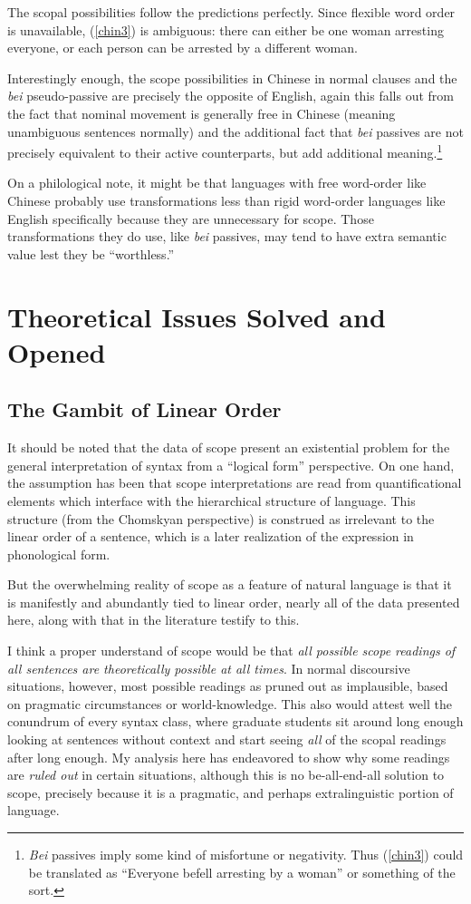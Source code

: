 \documentclass{article}
\begin{document}
The scopal possibilities follow the predictions perfectly. Since flexible word order is unavailable, (\ref{chin3}) is ambiguous: there can either be one woman arresting everyone, or each person can be arrested by a different woman.

Interestingly enough, the scope possibilities in Chinese in normal clauses and the \emph{bei} pseudo-passive are precisely the opposite of English, again this falls out from the fact that nominal movement is generally free in Chinese (meaning unambiguous sentences normally) and the additional fact that \emph{bei} passives are not precisely equivalent to their active counterparts, but add additional meaning.\footnote{\emph{Bei} passives imply some kind of misfortune or negativity. Thus (\ref{chin3}) could be translated as ``Everyone befell arresting by a woman'' or something of the sort.}

On a philological note, it might be that languages with free word-order like Chinese probably use transformations less than rigid word-order languages like English specifically because they are unnecessary for scope. Those transformations they do use, like \emph{bei} passives, may tend to have extra semantic value lest they be ``worthless.''


\section{Theoretical Issues Solved and Opened}

\subsection{The Gambit of Linear Order}

It should be noted that the data of scope present an existential problem for the general interpretation of syntax from a ``logical form'' perspective. On one hand, the assumption has been that scope interpretations are read from quantificational elements which interface with the hierarchical structure of language. This structure (from the Chomskyan perspective) is construed as irrelevant to the linear order of a sentence, which is a later realization of the expression in phonological form.

But the overwhelming reality of scope as a feature of natural language is that it is manifestly and abundantly tied to linear order, nearly all of the data presented here, along with that in the literature testify to this.

I think a proper understand of scope would be that \emph{all possible scope readings of all sentences are theoretically possible at all times}. In normal discoursive situations, however, most possible readings as pruned out as implausible, based on pragmatic circumstances or world-knowledge. This also would attest well the conundrum of every syntax class, where graduate students sit around long enough looking at sentences without context and start seeing \emph{all} of the scopal readings after long enough. My analysis here has endeavored to show why some readings are \emph{ruled out} in certain situations, although this is no be-all-end-all solution to scope, precisely because it is a pragmatic, and perhaps extralinguistic portion of language.
\end{document}
